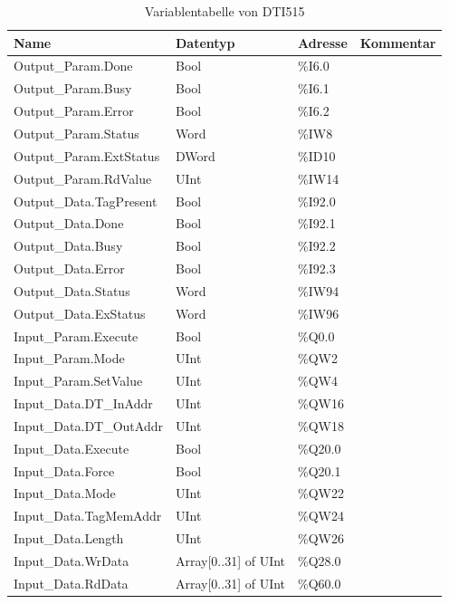 \begin{table}[h!]
	\centering
	\begin{tabular}{|l|l|l|l|}
		\hline
		\textbf{Name} & \textbf{Datentyp} & \textbf{Adresse} & \textbf{Kommentar} \\ \hline
		Output\_Param.Done & Bool & \%I6.0 & \\ \hline
		Output\_Param.Busy & Bool & \%I6.1 & \\ \hline
		Output\_Param.Error & Bool & \%I6.2 & \\ \hline
		Output\_Param.Status & Word & \%IW8 & \\ \hline
		Output\_Param.ExtStatus & DWord & \%ID10 & \\ \hline
		Output\_Param.RdValue & UInt & \%IW14 & \\ \hline
		Output\_Data.TagPresent & Bool & \%I92.0 & \\ \hline
		Output\_Data.Done & Bool & \%I92.1 & \\ \hline
		Output\_Data.Busy & Bool & \%I92.2 & \\ \hline
		Output\_Data.Error & Bool & \%I92.3 & \\ \hline
		Output\_Data.Status & Word & \%IW94 & \\ \hline
		Output\_Data.ExStatus & Word & \%IW96 & \\ \hline
		Input\_Param.Execute & Bool & \%Q0.0 & \\ \hline
		Input\_Param.Mode & UInt & \%QW2 & \\ \hline
		Input\_Param.SetValue & UInt & \%QW4 & \\ \hline
		Input\_Data.DT\_InAddr & UInt & \%QW16 & \\ \hline
		Input\_Data.DT\_OutAddr & UInt & \%QW18 & \\ \hline
		Input\_Data.Execute & Bool & \%Q20.0 & \\ \hline
		Input\_Data.Force & Bool & \%Q20.1 & \\ \hline
		Input\_Data.Mode & UInt & \%QW22 & \\ \hline
		Input\_Data.TagMemAddr & UInt & \%QW24 & \\ \hline
		Input\_Data.Length & UInt & \%QW26 & \\ \hline
		Input\_Data.WrData & Array[0..31] of UInt & \%Q28.0 & \\ \hline
		Input\_Data.RdData & Array[0..31] of UInt & \%Q60.0 & \\ \hline
	\end{tabular}
	\caption{Variablentabelle von DTI515}
	\label{tab:DTI515}
\end{table}
